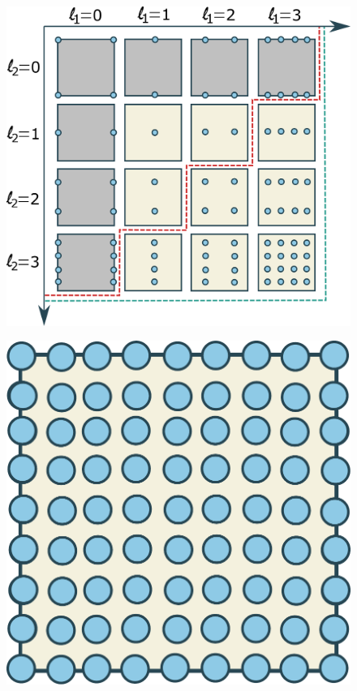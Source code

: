 \documentclass[
  a4paper,  %
  twoside,  %
  bibliography=totoc,
  headsepline,
  cleardoublepage=empty,
  parskip=half,
  draft=false
]{scrbook}
\begin{document}
\begin{mdframed}[style=style]
\vspace{2.5mm}
\begin{figure}[H]
        \centering
\begin{minipage}{.71\textwidth}
        \centering
  \includegraphics[width=.8\linewidth]{graphics/grid_subspaces}
\label{fig:grid_splitting}
\vspace{2.5mm}
    \end{minipage}%
    \begin{minipage}{0.28\textwidth}
        \centering
  \includegraphics[width=.8\linewidth]{graphics/full_grid}

\end{minipage}
\end{figure}
\end{mdframed}
\end{document}
